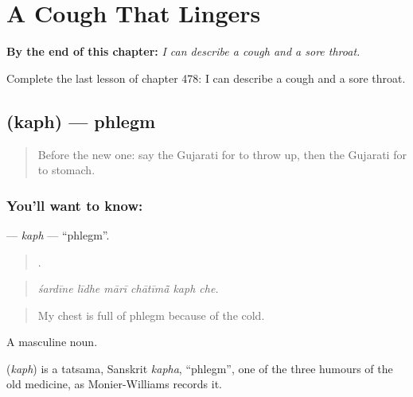 
\chapter{A Cough That Lingers}
\label{ch:gu-a-cough-that-lingers}

\begin{chapteropening}
\textbf{By the end of this chapter:} \emph{I can describe a cough and a sore throat.}

Complete the last lesson of chapter 478: I can describe a cough and a sore throat.
\end{chapteropening}

\section[\texorpdfstring{\gu{કફ} (kaph)}{કફ (kaph)}]{ (kaph) — phlegm}

\label{lesson:GU-C478-kaph}



\begin{quote}
Before the new one: say the Gujarati for to throw up, then the Gujarati for to stomach.
\end{quote}

\subsection*{You'll want to know: }
\textbf{} — \emph{kaph} — \textquotedblleft{}phlegm\textquotedblright{}.

\begin{quote}
     .
\end{quote}

\begin{quote}
\emph{śardīne līdhe mārī chātīmā̃ kaph che.}
\end{quote}

\begin{quote}
My chest is full of phlegm because of the cold.
\end{quote}

A masculine noun.

\begin{cousinweb}
\textbf{} (\emph{kaph}) is a tatsama, Sanskrit \emph{kapha}, \textquotedblleft{}phlegm\textquotedblright{}, one of the three humours of the old medicine, as Monier-Williams records it.
\end{cousinweb}


